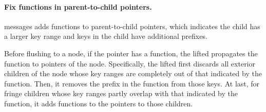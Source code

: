 \paragraph{Fix \xf functions in parent-to-child pointers.}
\goto messages adds \xf functions to parent-to-child pointers, which indicates
the child has a larger key range and keys in the child have additional prefixes.

Before flushing to a node, if the pointer has a \xf function, the
lifted \bedag propagates the \xf function to pointers of the node.
Specifically, the lifted \bedag first discards all exterior children of the node
whose key ranges are completely out of that indicated by the \xf function.
Then, it removes the prefix in the \xf function from those keys.
At last, for fringe children whose key ranges partly overlap with that indicated
by the \xf function, it adds \xf functions to the pointers to those children.


